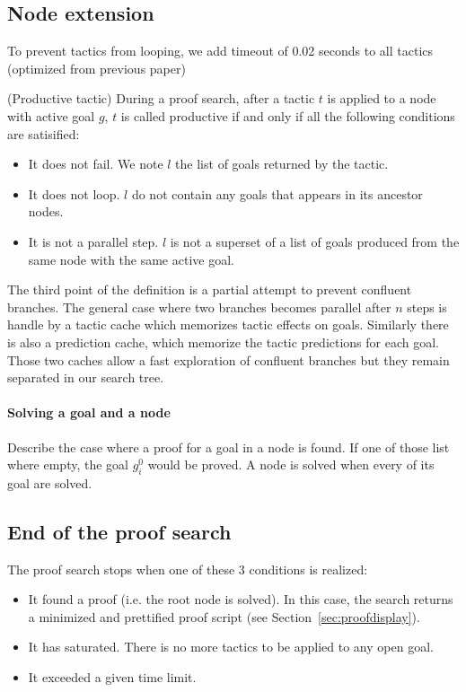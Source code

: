 \documentclass[runningheads,a4paper,draft]{svjour3}
\begin{document}
\subsection{Node extension}

To prevent tactics from looping, we add timeout of 0.02 seconds to all tactics 
(optimized from previous paper)

\begin{definition} (Productive tactic)
During a proof search, after a tactic $t$ is applied to a node with active goal 
$g$, 
$t$ is called 
productive if and only if all the following conditions are satisified:
\begin{itemize}
\item It does not fail. We note $l$ the list of goals returned by the tactic.
\item It does not loop. $l$ do not contain any goals that appears in its 
ancestor nodes.
\item It is not a parallel step. $l$ is not a superset of a list of goals 
produced from the same node with the same active goal.
\end{itemize}

The third point of the definition is a partial attempt to prevent confluent 
branches. The general 
case where two branches becomes parallel after $n$ steps is handle by a
tactic cache which memorizes tactic effects on goals. Similarly there is also a 
prediction cache, which memorize the tactic predictions for each goal. Those 
two caches allow a fast exploration of confluent branches but they remain 
separated in our search tree.

\paragraph{Solving a goal and a node}
Describe the case where a proof for a goal in a node is found.
If one of those list where empty, the goal $g_i^0$ would 
be proved.
A node is solved when every of its goal are solved.


\subsection{End of the proof search}
The proof search stops when one of these 3 conditions is realized:
\begin{itemize}
\item It found a proof (i.e. the root node is solved). In this case, 
the search returns a minimized and 
prettified proof script (see Section~\ref{sec:proofdisplay}).
\item It has saturated. 
There is no more tactics to be applied to any open goal. 
\item It exceeded a given time limit.
\end{itemize}


\end{definition}
\end{document}
